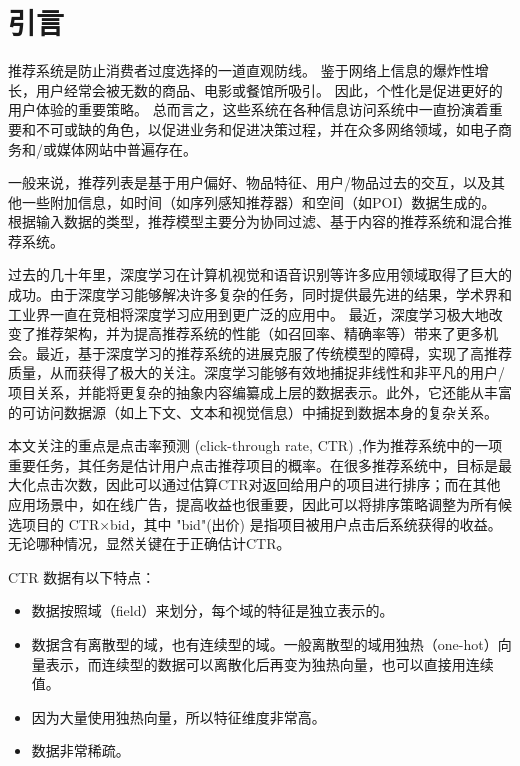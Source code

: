\documentclass[degree=project,degree-type=project,cjk-font=noto]{thuthesis}
\begin{document}
\tableofcontents

\listoffiguresandtables

\mainmatter

\chapter{引言}

推荐系统是防止消费者过度选择的一道直观防线。
鉴于网络上信息的爆炸性增长，用户经常会被无数的商品、电影或餐馆所吸引。
因此，个性化是促进更好的用户体验的重要策略。
总而言之，这些系统在各种信息访问系统中一直扮演着重要和不可或缺的角色，以促进业务和促进决策过程，并在众多网络领域，如电子商务和/或媒体网站中普遍存在。

一般来说，推荐列表是基于用户偏好、物品特征、用户/物品过去的交互，以及其他一些附加信息，如时间（如序列感知推荐器）和空间（如POI）数据生成的。
根据输入数据的类型，推荐模型主要分为协同过滤、基于内容的推荐系统和混合推荐系统。

过去的几十年里，深度学习在计算机视觉和语音识别等许多应用领域取得了巨大的成功。由于深度学习能够解决许多复杂的任务，同时提供最先进的结果，学术界和工业界一直在竞相将深度学习应用到更广泛的应用中。
最近，深度学习极大地改变了推荐架构，并为提高推荐系统的性能（如召回率、精确率等）带来了更多机会。最近，基于深度学习的推荐系统的进展克服了传统模型的障碍，实现了高推荐质量，从而获得了极大的关注。深度学习能够有效地捕捉非线性和非平凡的用户/项目关系，并能将更复杂的抽象内容编纂成上层的数据表示。此外，它还能从丰富的可访问数据源（如上下文、文本和视觉信息）中捕捉到数据本身的复杂关系。

本文关注的重点是点击率预测 (click-through rate, CTR) ,作为推荐系统中的一项重要任务，其任务是估计用户点击推荐项目的概率。在很多推荐系统中，目标是最大化点击次数，因此可以通过估算CTR对返回给用户的项目进行排序；而在其他应用场景中，如在线广告，提高收益也很重要，因此可以将排序策略调整为所有候选项目的 CTR×bid，其中 "bid"(出价) 是指项目被用户点击后系统获得的收益。无论哪种情况，显然关键在于正确估计CTR。

CTR 数据有以下特点：

\begin{itemize}
  \item 数据按照域（field）来划分，每个域的特征是独立表示的。
  \item 数据含有离散型的域，也有连续型的域。一般离散型的域用独热（one-hot）向量表示，而连续型的数据可以离散化后再变为独热向量，也可以直接用连续值。
  \item 因为大量使用独热向量，所以特征维度非常高。
  \item 数据非常稀疏。
\end{itemize}
\end{document}
